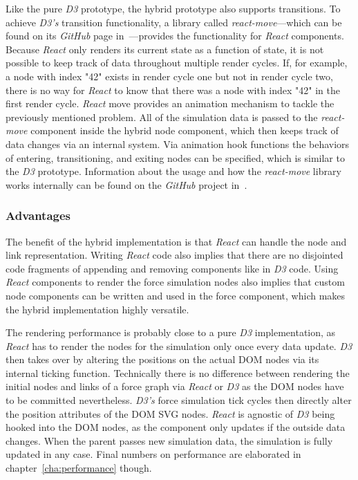 Like the pure \emph{D3} prototype, the hybrid prototype also supports transitions. To achieve \emph{D3's} transition functionality, a library called \emph{react-move}---which can be found on its \emph{GitHub} page in~\cite{ReactMove}---provides the functionality for \emph{React} components. Because \emph{React} only renders its current state as a function of state, it is not possible to keep track of data throughout multiple render cycles. If, for example, a node with index "42" exists in render cycle one but not in render cycle two, there is no way for \emph{React} to know that there was a node with index "42" in the first render cycle. \emph{React} move provides an animation mechanism to tackle the previously mentioned problem. All of the simulation data is passed to the \emph{react-move} component inside the hybrid node component, which then keeps track of data changes via an internal system. Via animation hook functions the behaviors of entering, transitioning, and exiting nodes can be specified, which is similar to the \emph{D3} prototype. Information about the usage and how the \emph{react-move} library works internally can be found on the \emph{GitHub} project in~\cite{ReactMove}.


\subsubsection{Advantages}

The benefit of the hybrid implementation is that \emph{React} can handle the node and link representation. Writing \emph{React} code also implies that there are no disjointed code fragments of appending and removing components like in \emph{D3} code. Using \emph{React} components to render the force simulation nodes also implies that custom node components can be written and used in the force component, which makes the hybrid implementation highly versatile.

The rendering performance is probably close to a pure \emph{D3} implementation, as \emph{React} has to render the nodes for the simulation only once every data update. \emph{D3} then takes over by altering the positions on the actual DOM nodes via its internal ticking function. Technically there is no difference between rendering the initial nodes and links of a force graph via \emph{React} or \emph{D3} as the DOM nodes have to be committed nevertheless. \emph{D3's} force simulation tick cycles then directly alter the position attributes of the DOM SVG nodes. \emph{React} is agnostic of \emph{D3} being hooked into the DOM nodes, as the component only updates if the outside data changes. When the parent passes new simulation data, the simulation is fully updated in any case. Final numbers on performance are elaborated in chapter~\ref{cha:performance} though.


